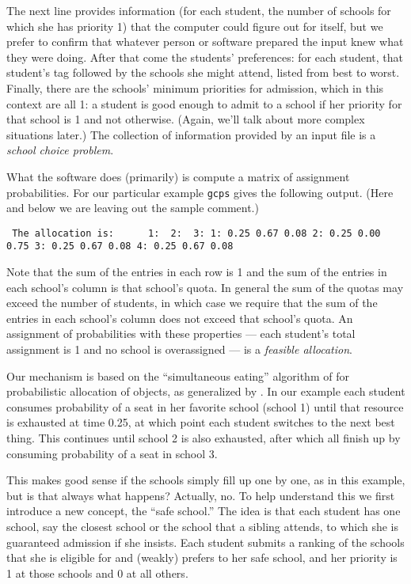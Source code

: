 \documentclass[12pt]{article}
\theoremstyle{definition}
\begin{document}
The next line provides information (for each student, the number of
schools for which she has priority 1) that the computer could figure
out for itself, but we prefer to confirm that whatever person or
software prepared the input knew what they were doing.  After that
come the students' preferences: for each student, that student's tag
followed by the schools she might attend, listed from best to worst.
Finally, there are the schools' minimum priorities for admission,
which in this context are all 1: a student is good enough to admit to
a school if her priority for that school is 1 and not
otherwise. (Again, we'll talk about more complex situations later.)
The collection of information provided by an input file is a
\emph{school choice problem}.

What the software does (primarily) is compute a matrix of assignment
probabilities.  For our particular example \texttt{gcps} gives the
following output.  (Here and below we are leaving out the sample comment.)
\medskip
\begin{obeylines}\texttt{
The allocation is:
\ \ \ \ \ 1:    \    2:  \      3:
1:      0.25     0.67     0.08
2:      0.25     0.00     0.75
3:      0.25     0.67     0.08
4:      0.25     0.67     0.08
}
\end{obeylines} \noindent

\smallskip
Note that the sum of the entries in each row is 1 and the sum of the
entries in each school's column is that school's quota.  In general
the sum of the quotas may exceed the number of students, in which case
we require that the sum of the entries in each school's column does
not exceed that school's quota. An assignment of probabilities with
these properties --- each student's total assignment is 1 and no
school is overassigned --- is a \emph{feasible allocation}.  

Our mechanism is based on the ``simultaneous eating'' algorithm of
\cite{bm01} for probabilistic allocation of objects, as generalized by
\cite{balbuzanov22jet}.  In our example each student consumes
probability of a seat in her favorite school (school 1) until that
resource is exhausted at time 0.25, at which point each student
switches to the next best thing.  This continues until school 2 is
also exhausted, after which all finish up by consuming probability of
a seat in school 3.

This makes good sense if the schools simply fill up one by one, as in
this example, but is that always what happens?  Actually, no.  To help
understand this we first introduce a new concept, the ``safe school.''
The idea is that each student has one school, say the closest school
or the school that a sibling attends, to which she is guaranteed
admission if she insists.  Each student submits a ranking of the
schools that she is eligible for and (weakly) prefers to her safe
school, and her priority is 1 at those schools and 0 at all others.
\end{document}
